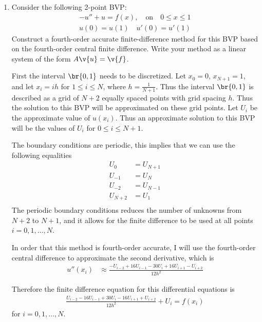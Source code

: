 \documentclass[11pt, oneside]{article}
\begin{document}
\begin{enumerate}
    \item %
        Consider the following 2-point BVP:
        \begin{align*}
            -u'' + u = f(x), \quad \text{on} \quad 0 \le x \le 1 \\
            u(0) = u(1) \quad u'(0) = u'(1)
        \end{align*}
        Construct a fourth-order accurate finite-difference method for this BVP
        based on the fourth-order central finite difference.
        Write your method as a linear system of the form $A\v{u} = \v{f}$.

        First the interval $\br{0, 1}$ needs to be discretized.
        Let $x_0 = 0$, $x_{N + 1} = 1$, and let $x_{i} = ih$ for $1 \le i \le N$,
        where $h = \frac{1}{N+1}$.
        Thus the interval $\br{0, 1}$ is described as a grid of $N+2$ equally
        spaced points with grid spacing $h$.
        Thus the solution to this BVP will be approximated on these grid points.
        Let $U_i$ be the approximate value of $u(x_i)$.
        Thus an approximate solution to this BVP will be the values of $U_i$ for
        $0 \le i \le N+1$.

        The boundary conditions are periodic, this implies that we can use the
        following equalities
        \begin{align*}
            U_0 &= U_{N+1} \\
            U_{-1} &= U_{N} \\
            U_{-2} &= U_{N-1} \\
            U_{N+2} &= U_1 \\
        \end{align*}
        The periodic boundary conditions reduces the number of unknowns from
        $N+2$ to $N+1$, and it allows for the finite difference to be
        used at all points $i = 0, 1, \ldots, N$.

        In order that this method is fourth-order accurate, I will use the
        fourth-order central difference to approximate the second derivative,
        which is
        \begin{align*}
            u''(x_i) &\approx \frac{-U_{i-2} + 16U_{i-1} - 30U_i + 16U_{i+1} - U_{i+2}}{12h^2}
        \end{align*}

        Therefore the finite difference equation for this differential equations
        is
        \begin{align*}
            \frac{U_{i-2} - 16U_{i-1} + 30U_i - 16U_{i+1} + U_{i+2}}{12h^2} + U_i = f(x_i)
        \end{align*}
        for $i = 0, 1, \ldots, N$.


\end{enumerate}
\end{document}
